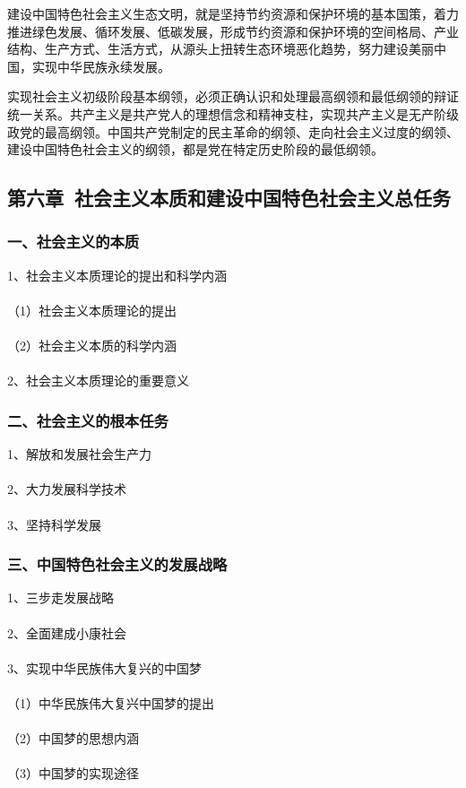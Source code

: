 \documentclass{ctexart}
\begin{document}
建设中国特色社会主义生态文明，就是坚持节约资源和保护环境的基本国策，着力推进绿色发展、循环发展、低碳发展，形成节约资源和保护环境的空间格局、产业结构、生产方式、生活方式，从源头上扭转生态环境恶化趋势，努力建设美丽中国，实现中华民族永续发展。

实现社会主义初级阶段基本纲领，必须正确认识和处理最高纲领和最低纲领的辩证统一关系。共产主义是共产党人的理想信念和精神支柱，实现共产主义是无产阶级政党的最高纲领。中国共产党制定的民主革命的纲领、走向社会主义过度的纲领、建设中国特色社会主义的纲领，都是党在特定历史阶段的最低纲领。

\subsection{第六章\ 社会主义本质和建设中国特色社会主义总任务}
\subsubsection{一、社会主义的本质}
1、社会主义本质理论的提出和科学内涵
\\\\
（1）社会主义本质理论的提出
\\\\
（2）社会主义本质的科学内涵
\\\\

2、社会主义本质理论的重要意义

\subsubsection{二、社会主义的根本任务}
1、解放和发展社会生产力
\\\\

2、大力发展科学技术
\\\\

3、坚持科学发展

\subsubsection{三、中国特色社会主义的发展战略}
1、三步走发展战略
\\\\

2、全面建成小康社会
\\\\

3、实现中华民族伟大复兴的中国梦
\\\\
（1）中华民族伟大复兴中国梦的提出
\\\\
（2）中国梦的思想内涵
\\\\
（3）中国梦的实现途径
\end{document}
